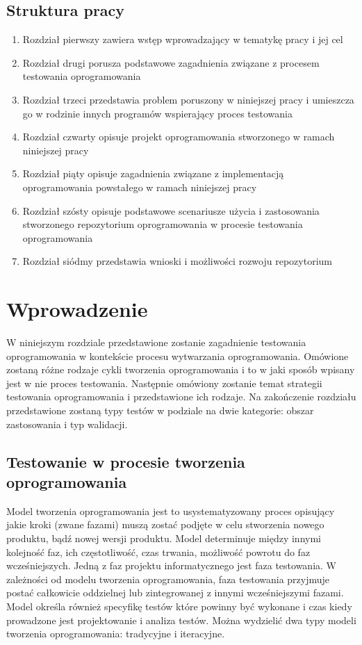 \section{Struktura pracy}
\begin{enumerate}
  \item Rozdział pierwszy zawiera wstęp wprowadzający w tematykę pracy i jej  cel
  \item Rozdział drugi porusza podstawowe zagadnienia związane z procesem testowania oprogramowania
  \item Rozdział trzeci przedstawia problem poruszony w niniejszej pracy i umieszcza go w rodzinie innych programów wspierający proces testowania
  \item Rozdział czwarty opisuje projekt oprogramowania stworzonego w ramach niniejszej pracy
  \item Rozdział piąty opisuje zagadnienia związane z implementacją oprogramowania powstałego w ramach niniejszej pracy
  \item Rozdział szósty opisuje podstawowe scenariusze użycia i zastosowania stworzonego repozytorium oprogramowania w procesie testowania oprogramowania
  \item Rozdział siódmy przedstawia wnioski i możliwości rozwoju repozytorium 
\end{enumerate}


\chapter{Wprowadzenie}
W niniejszym rozdziale przedstawione zostanie zagadnienie testowania oprogramowania w kontekście procesu wytwarzania oprogramowania. Omówione zostaną różne rodzaje cykli tworzenia oprogramowania i to w jaki sposób wpisany jest w nie proces testowania. Następnie omówiony zostanie temat strategii testowania oprogramowania i przedstawione ich rodzaje. Na zakończenie rozdziału przedstawione zostaną typy testów w podziale na dwie kategorie: obszar zastosowania i typ walidacji.
\section{Testowanie w procesie tworzenia oprogramowania}
\label{sec:testowanieWprocesie}
Model tworzenia oprogramowania jest to usystematyzowany proces opisujący jakie kroki (zwane fazami) muszą zostać podjęte w celu stworzenia nowego produktu, bądź nowej wersji produktu. Model determinuje między innymi kolejność faz, ich częstotliwość, czas trwania, możliwość powrotu do faz wcześniejszych. Jedną z faz projektu informatycznego jest faza testowania. W zależności od modelu tworzenia oprogramowania, faza testowania przyjmuje postać całkowicie oddzielnej lub zintegrowanej z innymi wcześniejszymi fazami. Model określa również specyfikę testów które powinny być wykonane  i czas kiedy prowadzone jest projektowanie i analiza testów.
Można wydzielić dwa typy modeli tworzenia oprogramowania: tradycyjne i iteracyjne.  
